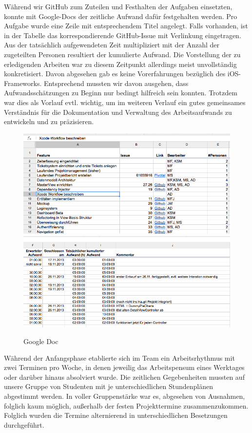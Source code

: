 	Während wir GitHub zum Zuteilen und Festhalten der Aufgaben einsetzten, konnte mit Google-Docs der zeitliche Aufwand dafür festgehalten werden. Pro Aufgabe wurde eine Zeile mit entsprechendem Titel angelegt. Falls vorhanden, ist in der Tabelle das korrespondierende GitHub-Issue mit Verlinkung eingetragen. Aus der tatsächlich aufgewendeten Zeit multipliziert mit der Anzahl der zugeteilten Personen resultiert der kumulierte Aufwand. Die Vorstellung der zu erledigenden Arbeiten war zu diesem Zeitpunkt allerdings meist unvollständig konkretisiert. Davon abgesehen gab es keine Vorerfahrungen bezüglich des iOS-Frameworks. Entsprechend mussten wir davon ausgehen, dass Aufwandsschätzungen zu Beginn nur bedingt hilfreich sein konnten. Trotzdem war dies als Vorlauf evtl. wichtig, um im weiteren Verlauf ein gutes gemeinsames Verständnis für die Dokumentation und Verwaltung des Arbeitsaufwands zu entwickeln und zu präzisieren. 

\begin{figure}[h]
	\centering
	\includegraphics[scale=.25]{Pictures/gdocs1} \\
	\includegraphics[scale=.25]{Pictures/gdocs2}
	\caption{Google Doc\label{fig:GDoc}}
\end{figure}

	Während der Anfangsphase etablierte sich im Team ein Arbeitsrhythmus mit zwei Terminen pro Woche, in denen jeweilig das Arbeitspensum eines Werktages oder darüber hinaus absolviert wurde. Die zeitlichen Gegebenheiten mussten auf unsere Gruppe von Studenten mit je unterschiedlichen Stundenplänen abgestimmt werden. In voller Gruppenstärke war es, abgesehen von Ausnahmen, folglich kaum möglich, außerhalb der festen Projekttermine zusammenzukommen. Folglich wurden die Termine alternierend in unterschiedlichen Besetzungen durchgeführt. 

